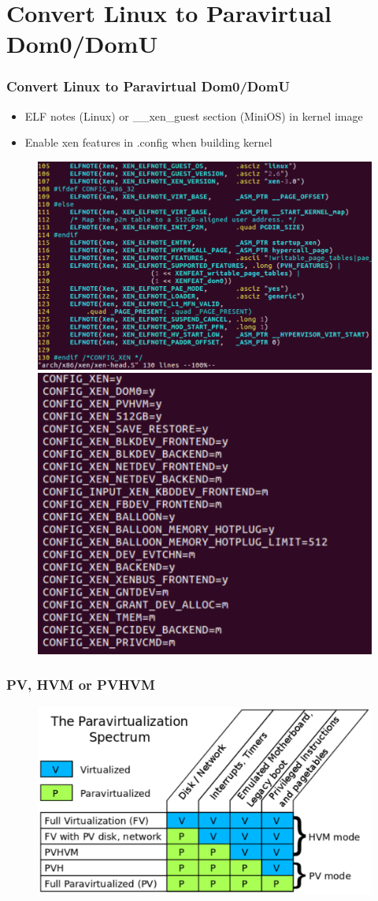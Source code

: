 \documentclass[aspectratio=169]{beamer}
\begin{document}
\section {Convert Linux to Paravirtual Dom0/DomU}
\begin{frame}
\frametitle{Convert Linux to Paravirtual Dom0/DomU}
\begin{itemize}
\item ELF notes (Linux) or \_\_xen\_guest section (MiniOS) in kernel image
\item Enable xen features in .config when building kernel
\end{itemize}
\begin{center}
\begin{figure}
\includegraphics[width=0.5\linewidth]{figures/elfnote.pdf}
\vspace{10 mm}
\includegraphics[width=0.4\linewidth]{figures/config.pdf}
\end{figure}
\end{center}

\end{frame}


\begin{frame}
\frametitle{PV, HVM or PVHVM}
\begin{figure}
\includegraphics[width=0.8\linewidth]{figures/spectrum.pdf}
\end{figure}
\end{frame}
\end{document}
